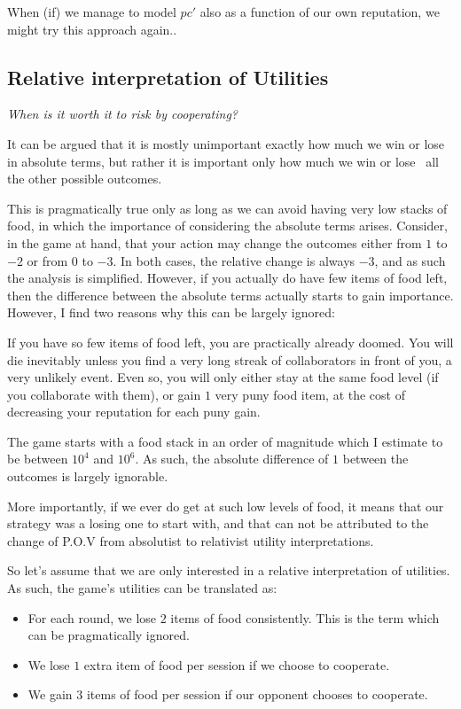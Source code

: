 \documentclass[10pt,fleqn]{article}
\begin{document}
When (if) we manage to model $pc'$ also as a function of our own reputation, we
might try this approach again..

\subsection{Relative interpretation of Utilities}
\emph{When is it worth it to risk by cooperating?}

It can be argued that it is mostly unimportant exactly how much we win or lose
in absolute terms, but rather it is important only how much we win or lose \wrt\
all the other possible outcomes.

This is pragmatically true only as long as we can avoid having very low stacks
of food, in which the importance of considering the absolute terms arises.
Consider, in the game at hand, that your action may change the outcomes either
from $1$ to $-2$ or from $0$ to $-3$. In both cases, the relative change is
always $-3$, and as such the analysis is simplified. However, if you actually do
have few items of food left, then the difference between the absolute terms
actually starts to gain importance. However, I find two reasons why this can be
largely ignored:
\begin{inlist}
  \item If you have so few items of food left, you are practically already
  doomed. You will die inevitably unless you find a very long streak of
  collaborators in front of you, a very unlikely event. Even so, you will only
  either stay at the same food level (if you collaborate with them), or gain $1$
  very puny food item, at the cost of decreasing your reputation for each puny
  gain.
  \item The game starts with a food stack in an order of magnitude which I
  estimate to be between $10^4$ and $10^6$. As such, the absolute difference of
  $1$ between the outcomes is largely ignorable.
  \item More importantly, if we ever do get at such low levels of food, it means
  that our strategy was a losing one to start with, and that can not be
  attributed to the change of P.O.V from absolutist to relativist utility
  interpretations.
\end{inlist}

So let's assume that we are only interested in a relative interpretation of
utilities. As such, the game's utilities can be translated as:
\begin{itemize}
  \item For each round, we lose $2$ items of food consistently. This is the term
  which can be pragmatically ignored.
  \item We lose $1$ extra item of food per session if we choose to cooperate.
  \item We gain $3$ items of food per session if our opponent chooses to
  cooperate.
\end{itemize}
\end{document}
